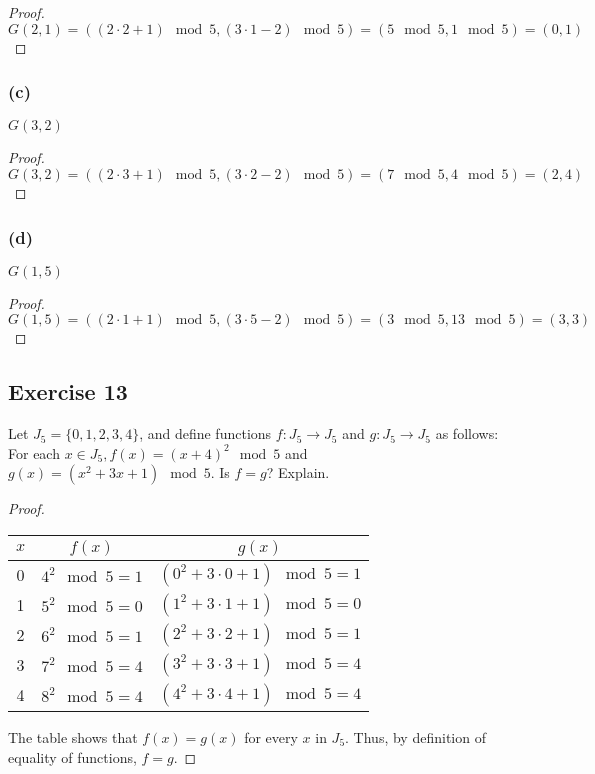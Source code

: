 \documentclass[14pt]{extarticle}
\begin{document}
\begin{proof}
    \(G(2, 1) = ((2 \cdot 2 + 1) \mod 5, (3 \cdot 1 - 2) \mod 5) = (5 \mod 5, 1 \mod 5) = (0, 1)\)
\end{proof}

\subsubsection{(c)}
$G(3,2)$

\begin{proof}
    \(G(3, 2) = ((2 \cdot 3 + 1) \mod 5, (3 \cdot 2 - 2) \mod 5) = (7 \mod 5, 4 \mod 5) = (2, 4)\)
\end{proof}

\subsubsection{(d)}
$G(1,5)$

\begin{proof}
    \(G(1, 5) = ((2 \cdot 1 + 1) \mod 5, (3 \cdot 5 - 2) \mod 5) = (3 \mod 5, 13 \mod 5) = (3, 3)\)
\end{proof}

\subsection{Exercise 13}
Let \(J_5 = \{0, 1, 2, 3, 4\}\), and define functions \(f: J_5 \to J_5\) and \(g: J_5 \to J_5\) as follows: For each
\(x \in J_5, f(x) = (x + 4)^2 \mod 5\) and \(g(x) = (x^2 + 3x + 1) \mod 5\). Is $f = g$? Explain.

\begin{proof}
    \begin{center}
        \begin{tabular}{|c|c|c|}
            \hline
            $x$ & $f(x)$             & $g(x)$                               \\
            \hline
            0   & \(4^2 \mod 5 = 1\) & \((0^2 + 3 \cdot 0 + 1) \mod 5 = 1\) \\
            \hline
            1   & \(5^2 \mod 5 = 0\) & \((1^2 + 3 \cdot 1 + 1) \mod 5 = 0\) \\
            \hline
            2   & \(6^2 \mod 5 = 1\) & \((2^2 + 3 \cdot 2 + 1) \mod 5 = 1\) \\
            \hline
            3   & \(7^2 \mod 5 = 4\) & \((3^2 + 3 \cdot 3 + 1) \mod 5 = 4\) \\
            \hline
            4   & \(8^2 \mod 5 = 4\) & \((4^2 + 3 \cdot 4 + 1) \mod 5 = 4\) \\
            \hline
        \end{tabular}
    \end{center}

    The table shows that \(f(x) = g(x)\) for every $x$ in \(J_5\). Thus, by definition of equality of functions, $f = g$.
\end{proof}
\end{document}
